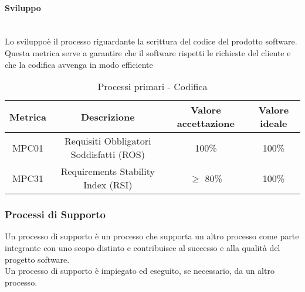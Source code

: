 \documentclass[10pt]{article}
\begin{document}
\begin{justify}
\paragraph{Sviluppo}\mbox{}\\
Lo sviluppoè  il processo riguardante la scrittura del codice del prodotto software.\\
Questa metrica serve a garantire che il software rispetti le richieste del cliente e che la codifica avvenga in modo efficiente\\
\begin{table}[H]
  \centering
\begin{tabular}{|c|c|c|c|}
  \hline
  \textbf{Metrica} & \textbf{Descrizione} & \textbf{Valore accettazione} & \textbf{Valore ideale}\\
  \hline
  MPC01 & Requisiti Obbligatori Soddisfatti (ROS) & 100\% & 100\%\\
  \hline
  MPC31 & Requirements Stability Index (RSI) & $\geq$ 80\% & 100\% \\
  \hline
\end{tabular}
\caption{Processi primari - Codifica}
\label{tab:codifica}
\end{table}


\subsubsection{Processi di Supporto}
Un processo di supporto è un processo che supporta un altro processo come parte integrante con uno scopo distinto e contribuisce al successo e alla qualità del progetto software.\\
Un processo di supporto è impiegato ed eseguito, se necessario, da un altro processo.\\

\end{justify}
\end{document}
